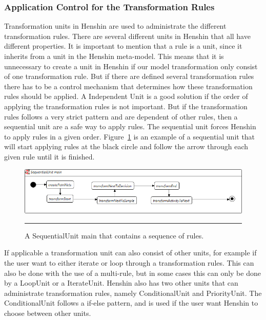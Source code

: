 \subsubsection*{Application Control for the Transformation Rules}
Transformation units in Henshin are used to administrate the different
transformation rules. There are several different units in Henshin that all have
different properties. It is important to mention that a rule is a unit,
since it inherits from a unit in the Henshin meta-model. This means that it is
unnecessary to create a unit in Henshin if our model transformation only
consist of one transformation rule. But if there are defined several
transformation rules there has to be a control mechanism that determines how
these transformation rules should be applied. A Independent Unit is a good
solution if the order of applying the transformation rules is not important.
But if the transformation rules follows a very strict pattern and are dependent
of other rules, then a sequential unit are a safe way to apply rules. The
sequential unit forces Henshin to apply rules in a given order.
Figure~\ref{fig:SequentialUnitHenshin} is an example of a sequential unit
that will start applying rules at the black circle and follow the arrow
through each given rule until it is finished.  

\begin{figure}[H]
	\centering
	\includegraphics[scale=0.5]{figures/SequentialUnitHenshin.png}
	\rule{35em}{0.5pt}
	\caption[A Sequential Unit in Henshin]
	{A SequentialUnit main that contains a sequence of rules.}
	\label{fig:SequentialUnitHenshin}
\end{figure}

If applicable a transformation unit can also consist of other units, for example
if the user want to either iterate or loop through a transformation rules. This
can also be done with the use of a multi-rule, but in some cases this can only
be done by a LoopUnit or a IterateUnit. Henshin also has two other units that
can administrate transformation rules, namely ConditionalUnit and PriorityUnit.
The ConditionalUnit follows a if-else pattern, and is used if the user want
Henshin to choose between other units. 

